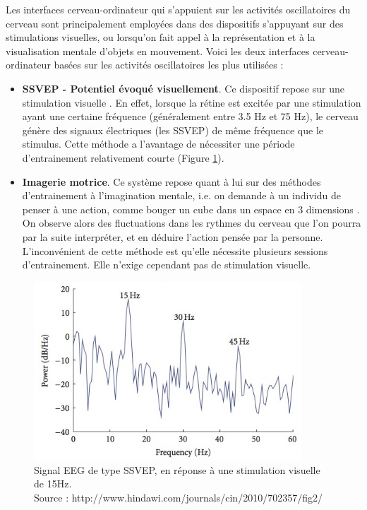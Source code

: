 Les interfaces cerveau-ordinateur qui s'appuient sur les activités oscillatoires du cerveau sont principalement employées dans des dispositifs s'appuyant sur des stimulations visuelles, ou lorsqu'on fait appel à la représentation et à la visualisation mentale d'objets en mouvement. Voici les deux interfaces cerveau-ordinateur basées sur les activités oscillatoires les plus utilisées : 
\smallbreak
\begin{itemize}
	\item \textbf{SSVEP - Potentiel évoqué visuellement}. Ce dispositif repose sur une stimulation visuelle \cite{SSVEP}. En effet, lorsque la rétine est excitée par une stimulation ayant une certaine fréquence (généralement entre 3.5 Hz et 75 Hz), le cerveau génère des signaux électriques (les SSVEP) de même fréquence que le stimulus. Cette méthode a l'avantage de nécessiter une période d'entrainement relativement courte (Figure \ref{SSVEP}).
	\smallbreak
	\item \textbf{Imagerie motrice}. Ce système repose quant à lui sur des méthodes d'entrainement à l'imagination mentale, i.e. on demande à un individu de penser à une action, comme bouger un cube dans un espace en 3 dimensions \cite{motor}. On observe alors des fluctuations dans les rythmes du cerveau que l'on pourra par la suite interpréter, et en déduire l'action pensée par la personne. L'inconvénient de cette méthode est qu'elle nécessite plusieurs sessions d'entrainement. Elle n'exige cependant pas de stimulation visuelle. 
\end{itemize}
\smallbreak
\begin{figure}[h]
	\centering\includegraphics[width=10cm]{images/SSVEPSIgnal.jpg}
	\caption[Signal EEG de type SSVEP, en réponse à une stimulation visuelle de 15Hz]{Signal EEG de type SSVEP, en réponse à une stimulation visuelle de 15Hz.\\Source : http://www.hindawi.com/journals/cin/2010/702357/fig2/}
	\label{SSVEP}
\end{figure}


